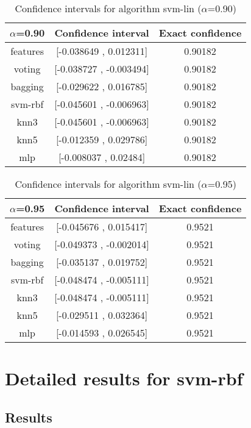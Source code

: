 \documentclass[a4paper,10pt]{article}
\begin{document}
\begin{table}[!htp]
\centering\small
\begin{tabular}{
|c|c|c|}
\hline
 $\alpha$=0.90 & Confidence interval & Exact confidence \\ \hline 
features & [-0.038649 , 0.012311] & 0.90182\\ \hline 
voting & [-0.038727 , -0.003494] & 0.90182\\ \hline 
bagging & [-0.029622 , 0.016785] & 0.90182\\ \hline 
svm-rbf & [-0.045601 , -0.006963] & 0.90182\\ \hline 
knn3 & [-0.045601 , -0.006963] & 0.90182\\ \hline 
knn5 & [-0.012359 , 0.029786] & 0.90182\\ \hline 
mlp & [-0.008037 , 0.02484] & 0.90182\\ \hline 

\end{tabular}
\caption{Confidence intervals for algorithm svm-lin ($\alpha$=0.90)}
\end{table}
\begin{table}[!htp]
\centering\small
\begin{tabular}{
|c|c|c|}
\hline
 $\alpha$=0.95 & Confidence interval & Exact confidence \\ \hline 
features & [-0.045676 , 0.015417] & 0.9521\\ \hline 
voting & [-0.049373 , -0.002014] & 0.9521\\ \hline 
bagging & [-0.035137 , 0.019752] & 0.9521\\ \hline 
svm-rbf & [-0.048474 , -0.005111] & 0.9521\\ \hline 
knn3 & [-0.048474 , -0.005111] & 0.9521\\ \hline 
knn5 & [-0.029511 , 0.032364] & 0.9521\\ \hline 
mlp & [-0.014593 , 0.026545] & 0.9521\\ \hline 

\end{tabular}
\caption{Confidence intervals for algorithm svm-lin ($\alpha$=0.95)}
\end{table}

 \clearpage 


\section{Detailed results for svm-rbf}


\subsection{Results}
\end{document}

